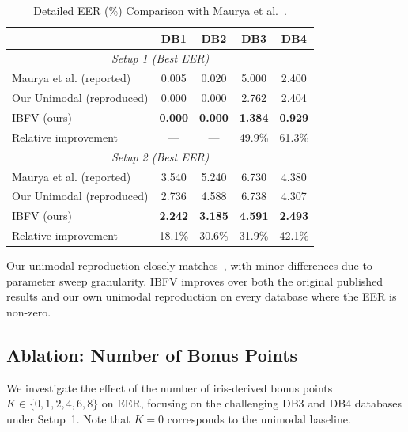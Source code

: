 \documentclass[3p,twocolumn]{elsarticle}
\newcommand{\IBFV}{\textsf{IBFV}}
\begin{document}
\begin{table}[t]
\centering
\caption{Detailed EER (\%) Comparison with Maurya et al.~\cite{maurya2025enhancing}.}
\label{tab:comparison}
\begin{tabular}{@{}l c c c c@{}}
\toprule
 & \textbf{DB1} & \textbf{DB2} & \textbf{DB3} & \textbf{DB4} \\
\midrule
\multicolumn{5}{c}{\textit{Setup 1 (Best EER)}} \\
\midrule
Maurya et al. (reported) & 0.005 & 0.020 & 5.000 & 2.400 \\
Our Unimodal (reproduced) & 0.000 & 0.000 & 2.762 & 2.404 \\
\IBFV{} (ours)            & \textbf{0.000} & \textbf{0.000} & \textbf{1.384} & \textbf{0.929} \\
Relative improvement      & --- & --- & 49.9\% & 61.3\% \\
\midrule
\multicolumn{5}{c}{\textit{Setup 2 (Best EER)}} \\
\midrule
Maurya et al. (reported) & 3.540 & 5.240 & 6.730 & 4.380 \\
Our Unimodal (reproduced) & 2.736 & 4.588 & 6.738 & 4.307 \\
\IBFV{} (ours)            & \textbf{2.242} & \textbf{3.185} & \textbf{4.591} & \textbf{2.493} \\
Relative improvement      & 18.1\% & 30.6\% & 31.9\% & 42.1\% \\
\bottomrule
\end{tabular}
\end{table}

Our unimodal reproduction closely matches~\cite{maurya2025enhancing}, with minor differences due to parameter sweep granularity. \IBFV{} improves over both the original published results and our own unimodal reproduction on every database where the EER is non-zero.

\subsection{Ablation: Number of Bonus Points}
\label{sec:ablation}

We investigate the effect of the number of iris-derived bonus points $K \in \{0, 1, 2, 4, 6, 8\}$ on EER, focusing on the challenging DB3 and DB4 databases under Setup~1. Note that $K = 0$ corresponds to the unimodal baseline.
\end{document}
